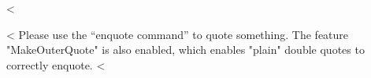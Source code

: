 <%

<%
Please use the \enquote{enquote command} to quote something.
The feature "MakeOuterQuote" is also enabled, which enables "plain" double quotes to correctly enquote.
<%
